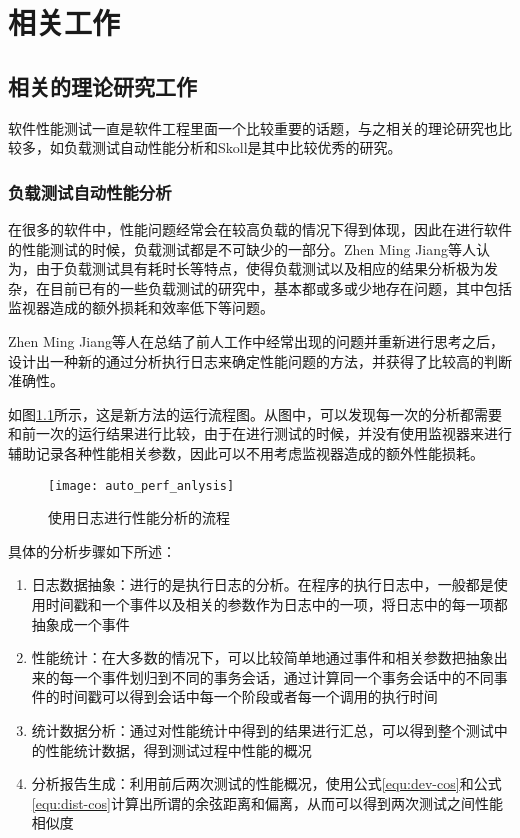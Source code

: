 
\chapter{相关工作}

\section{相关的理论研究工作}

软件性能测试一直是软件工程里面一个比较重要的话题，与之相关的理论研究也比较多，如负载测试自动性能分析\cite{Jiang:2010:AAL:1831708.1831726}和Skoll\cite{schmidt2001leveraging}是其中比较优秀的研究。

\subsection{负载测试自动性能分析}

在很多的软件中，性能问题经常会在较高负载的情况下得到体现，因此在进行软件的性能测试的时候，负载测试都是不可缺少的一部分。Zhen Ming Jiang等人认为，由于负载测试具有耗时长等特点，使得负载测试以及相应的结果分析极为发杂，在目前已有的一些负载测试的研究中，基本都或多或少地存在问题，其中包括监视器造成的额外损耗和效率低下等问题。

Zhen Ming Jiang等人在总结了前人工作中经常出现的问题并重新进行思考之后，设计出一种新的通过分析执行日志来确定性能问题的方法，并获得了比较高的判断准确性。

如图\ref{fig:auto_perf_anlysis}所示，这是新方法的运行流程图。从图中，可以发现每一次的分析都需要和前一次的运行结果进行比较，由于在进行测试的时候，并没有使用监视器来进行辅助记录各种性能相关参数，因此可以不用考虑监视器造成的额外性能损耗。


\begin{figure}[H]
\centering
\texttt{[image: auto\_perf\_anlysis]}
\caption{使用日志进行性能分析的流程}
\label{fig:auto_perf_anlysis}
\end{figure}


具体的分析步骤如下所述：

\begin{enumerate}
\item 日志数据抽象：进行的是执行日志的分析。在程序的执行日志中，一般都是使用时间戳和一个事件以及相关的参数作为日志中的一项，将日志中的每一项都抽象成一个事件
\item 性能统计：在大多数的情况下，可以比较简单地通过事件和相关参数把抽象出来的每一个事件划归到不同的事务会话，通过计算同一个事务会话中的不同事件的时间戳可以得到会话中每一个阶段或者每一个调用的执行时间
\item 统计数据分析：通过对性能统计中得到的结果进行汇总，可以得到整个测试中的性能统计数据，得到测试过程中性能的概况
\item 分析报告生成：利用前后两次测试的性能概况，使用公式\ref{equ:dev-cos}和公式\ref{equ:dist-cos}计算出所谓的余弦距离和偏离，从而可以得到两次测试之间性能相似度
\end{enumerate}

